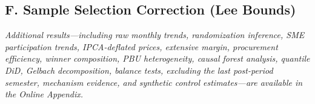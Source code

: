 \subsection*{F. Sample Selection Correction (Lee Bounds)}


\bigskip
\noindent\textit{Additional results---including raw monthly trends, randomization inference, SME participation trends, IPCA-deflated prices, extensive margin, procurement efficiency, winner composition, PBU heterogeneity, causal forest analysis, quantile DiD, Gelbach decomposition, balance tests, excluding the last post-period semester, mechanism evidence, and synthetic control estimates---are available in the Online Appendix.}
